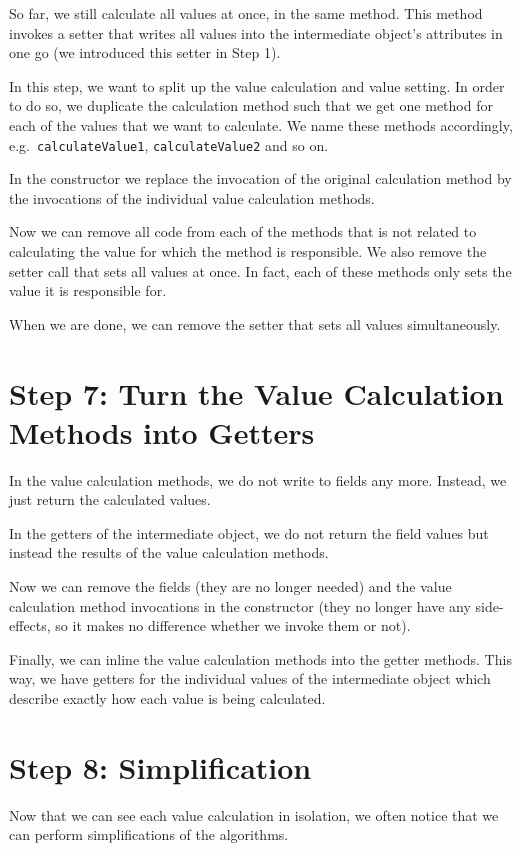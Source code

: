 \documentclass[a4paper,fleqn,titlepage,11pt]{article}
\begin{document}
So far, we still calculate all values at once, in the same method. This method invokes a setter that writes all values into the intermediate object's attributes in one go (we introduced this setter in Step 1).

In this step, we want to split up the value calculation and value setting. In order to do so, we duplicate the calculation method such that we get one method for each of the values that we want to calculate. We name these methods accordingly, e.g.~\texttt{calculateValue1}, \texttt{calculateValue2} and so on.

In the constructor we replace the invocation of the original calculation method by the invocations of the individual value calculation methods.

Now we can remove all code from each of the methods that is not related to calculating the value for which the method is responsible. We also remove the setter call that sets all values at once. In fact, each of these methods only sets the value it is responsible for.

When we are done, we can remove the setter that sets all values simultaneously.

\section{Step 7: Turn the Value Calculation Methods into Getters}

In the value calculation methods, we do not write to fields any more. Instead, we just return the calculated values.

In the getters of the intermediate object, we do not return the field values but instead the results of the value calculation methods.

Now we can remove the fields (they are no longer needed) and the value calculation method invocations in the constructor (they no longer have any side-effects, so it makes no difference whether we invoke them or not).

Finally, we can inline the value calculation methods into the getter methods. This way, we have getters for the individual values of the intermediate object which describe exactly how each value is being calculated.

\section{Step 8: Simplification}

Now that we can see each value calculation in isolation, we often notice that we can perform simplifications of the algorithms. 
\end{document}
